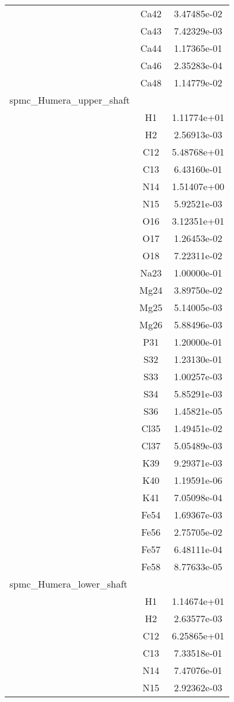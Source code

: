 \begin{centering}
\begin{longtable}{l c c}
& Ca42 & 3.47485e-02 \\ 
& Ca43 & 7.42329e-03 \\ 
& Ca44 & 1.17365e-01 \\ 
& Ca46 & 2.35283e-04 \\ 
& Ca48 & 1.14779e-02 \\ 
\hline
spmc_Humera_upper_shaft & & \\
\hline
& H1 & 1.11774e+01 \\ 
& H2 & 2.56913e-03 \\ 
& C12 & 5.48768e+01 \\ 
& C13 & 6.43160e-01 \\ 
& N14 & 1.51407e+00 \\ 
& N15 & 5.92521e-03 \\ 
& O16 & 3.12351e+01 \\ 
& O17 & 1.26453e-02 \\ 
& O18 & 7.22311e-02 \\ 
& Na23 & 1.00000e-01 \\ 
& Mg24 & 3.89750e-02 \\ 
& Mg25 & 5.14005e-03 \\ 
& Mg26 & 5.88496e-03 \\ 
& P31 & 1.20000e-01 \\ 
& S32 & 1.23130e-01 \\ 
& S33 & 1.00257e-03 \\ 
& S34 & 5.85291e-03 \\ 
& S36 & 1.45821e-05 \\ 
& Cl35 & 1.49451e-02 \\ 
& Cl37 & 5.05489e-03 \\ 
& K39 & 9.29371e-03 \\ 
& K40 & 1.19591e-06 \\ 
& K41 & 7.05098e-04 \\ 
& Fe54 & 1.69367e-03 \\ 
& Fe56 & 2.75705e-02 \\ 
& Fe57 & 6.48111e-04 \\ 
& Fe58 & 8.77633e-05 \\ 
\hline
spmc_Humera_lower_shaft & & \\
\hline
& H1 & 1.14674e+01 \\ 
& H2 & 2.63577e-03 \\ 
& C12 & 6.25865e+01 \\ 
& C13 & 7.33518e-01 \\ 
& N14 & 7.47076e-01 \\ 
& N15 & 2.92362e-03 \\ 

\end{longtable}
\end{centering}
